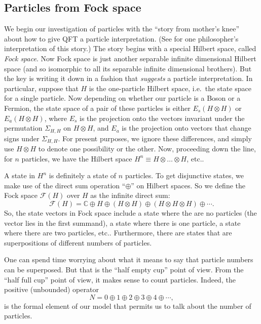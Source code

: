 \documentclass[12pt]{article}
\theoremstyle{definition}
\theoremstyle{definition}
\theoremstyle{remark}
\def\2#1{{\mathcal #1}}
\def\7#1{{\mathbb #1}}
\begin{document}
\subsection{Particles from Fock space} \label{focked}

We begin our investigation of particles with the ``story from mother's
knee'' about how to give QFT a particle interpretation.  (See
\cite{tell} for one philosopher's interpretation of this story.)  The
story begins with a special Hilbert space, called \emph{Fock space}.
Now Fock space is just another separable infinite dimensional Hilbert
space (and so isomorphic to all its separable infinite dimensional
brothers).  But the key is writing it down in a fashion that
\emph{suggests} a particle interpretation.  In particular, suppose
that $H$ is the one-particle Hilbert space, i.e.\ the state space for
a single particle.  Now depending on whether our particle is a Boson
or a Fermion, the state space of a pair of these particles is either
$E_s(H \otimes H)$ or $E_a(H \otimes H)$, where $E_s$ is the
projection onto the vectors invariant under the permutation $\Sigma
_{H,H}$ on $H\otimes H$, and $E_a$ is the projection onto vectors that
change signs under $\Sigma _{H,H}$.  For present purposes, we ignore
these differences, and simply use $H\otimes H$ to denote one
possibility or the other.  Now, proceeding down the line, for $n$
particles, we have the Hilbert space $H^n\equiv H\otimes \dots \otimes
H$, etc..

A state in $H^n$ is definitely a state of $n$ particles.  To get
disjunctive states, we make use of the direct sum operation
``$\oplus$'' on Hilbert spaces.  So we define the Fock space $\2F (H)$
over $H$ as the infinite direct sum:
$$ \2F (H)= \7C \oplus H \oplus (H\otimes H)\oplus (H\otimes H\otimes H)\oplus \cdots
.$$ So, the state vectors in Fock space include a state where the are
no particles (the vector lies in the first summand), a state where
there is one particle, a state where there are two particles, etc..
Furthermore, there are states that are superpositions of different
numbers of particles.

One can spend time worrying about what it means to say that particle
numbers can be superposed.  But that is the ``half empty cup'' point
of view.  From the ``half full cup'' point of view, it makes sense to
count particles.  Indeed, the positive (unbounded) operator
$$ N=0\oplus 1\oplus 2\oplus 3 \oplus 4 \oplus \cdots ,$$ 
is the formal element of our model that permits us to talk about the
number of particles.
\end{document}
